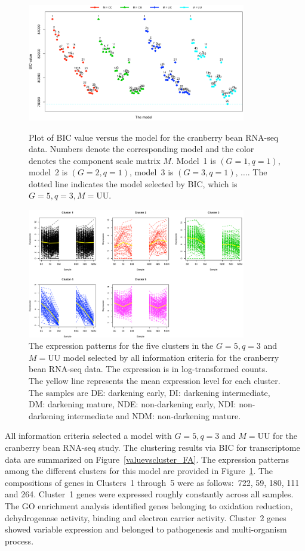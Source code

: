 \documentclass[12pt]{article}
\begin{document}
\begin{figure}[]
\centering
\includegraphics[width=0.85\textwidth]{Chap4_FA_Bozzo_modelselection.png}
\caption{Plot of BIC value versus the model for the cranberry bean RNA-seq data. Numbers denote the corresponding model and the color denotes the component scale matrix $M$. Model~1 is $(G=1,q=1)$, model~2 is $(G=2,q=1)$, model~3 is $(G=3,q=1)$, $\ldots.$  The dotted line indicates the model selected by BIC, which is $G=5,q=3,M=\text{UU}$.} 
\label{valuevscluster_FA}
\includegraphics[width=0.85\textwidth]{Chap4_FAMPLN_bozzo_trends2.png}
\caption{The expression patterns for the five clusters in the $G = 5, q = 3$ and $M = \text{UU}$ model selected by all information criteria for the cranberry bean RNA-seq data. The expression is in log-transformed counts. The yellow line represents the mean expression level for each cluster. The samples are DE:  darkening early, DI: darkening intermediate, DM: darkening mature, NDE: non-darkening early, NDI: non-darkening intermediate and NDM: non-darkening mature.}
\label{paper2_bozzo_trends}
\end{figure}

All information criteria selected a model with $G = 5, q = 3$ and $M = \text{UU}$ for the cranberry bean RNA-seq study. The clustering results via BIC for transcriptome data are summarized on Figure~\ref{valuevscluster_FA}. The expression patterns among the different clusters for this model are provided in Figure~\ref{paper2_bozzo_trends}. The compositions of genes in Clusters~1 through~5 were as follows:~722, 59, 180, 111 and 264. Cluster~1 genes were expressed roughly constantly across all samples. The GO enrichment analysis identified genes belonging to oxidation reduction, dehydrogenase activity, binding and electron carrier activity. Cluster~2 genes showed variable expression and belonged to pathogenesis and multi-organism process. 
\end{document}
